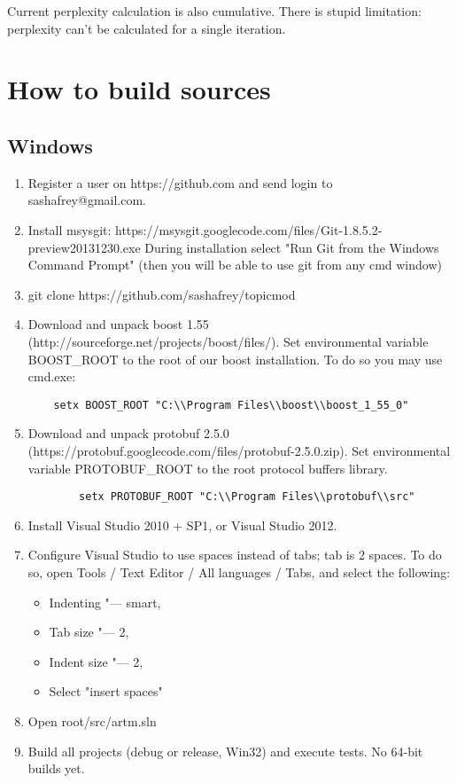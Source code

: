 \documentclass[11pt,a4paper,twoside]{report}
\begin{document}
Current perplexity calculation is also cumulative.
There is stupid limitation: perplexity can't be calculated for a single iteration.

\section{How to build sources}

\subsection{Windows}

\begin{enumerate}
    \item Register a user on https://github.com and send login to sashafrey@gmail.com.
    \item Install msysgit:
	https://msysgit.googlecode.com/files/Git-1.8.5.2-preview20131230.exe
   During installation select "Run Git from the Windows Command Prompt"
   (then you will be able to use git from any cmd window)
    \item git clone https://github.com/sashafrey/topicmod
    \item Download and unpack boost 1.55 (http://sourceforge.net/projects/boost/files/).
    Set environmental variable BOOST\_ROOT to the root of our boost installation.
    To do so you may use cmd.exe:
    \begin{verbatim}
    setx BOOST_ROOT "C:\\Program Files\\boost\\boost_1_55_0"
    \end{verbatim}
    \item Download and unpack protobuf 2.5.0 (https://protobuf.googlecode.com/files/protobuf-2.5.0.zip).
    Set environmental variable PROTOBUF\_ROOT to the root protocol buffers library.
    \begin{verbatim}
    	setx PROTOBUF_ROOT "C:\\Program Files\\protobuf\\src"
    \end{verbatim}
    \item Install Visual Studio 2010 + SP1, or Visual Studio 2012.
    \item Configure Visual Studio to use spaces instead of tabs; tab is 2 spaces.
    To do so, open Tools / Text Editor / All languages / Tabs, and select the following:
    \begin{itemize}
        \item Indenting "--- smart,
        \item Tab size "--- 2,
        \item Indent size "--- 2,
        \item Select "insert spaces"
    \end{itemize}
    \item Open root/src/artm.sln
    \item Build all projects (debug or release, Win32) and execute tests.
    No 64-bit builds yet.
\end{enumerate}
\end{document}

